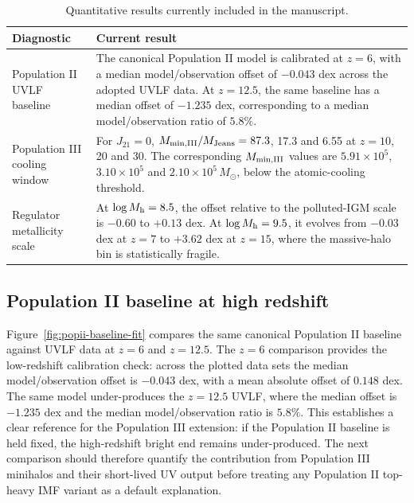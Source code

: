 \documentclass[twocolumn,times]{aastex701}
\begin{document}
\begin{table}[tbp!]
\caption{Quantitative results currently included in the manuscript.}
\label{tab:current-results}
\begin{tabular}{ll}
\toprule
\parbox[t]{0.25\textwidth}{Diagnostic} & \parbox[t]{0.66\textwidth}{Current result} \\
\midrule
\parbox[t]{0.25\textwidth}{Population II UVLF baseline} &
\parbox[t]{0.66\textwidth}{The canonical Population II model is calibrated at $z=6$, with a median model/observation offset of $-0.043$ dex across the adopted UVLF data. At $z=12.5$, the same baseline has a median offset of $-1.235$ dex, corresponding to a median model/observation ratio of $5.8\%$.} \\
\parbox[t]{0.25\textwidth}{Population III cooling window} &
\parbox[t]{0.66\textwidth}{For $J_{21}=0$, $M_{\rm min,III}/M_{\rm Jeans}=87.3$, 17.3 and 6.55 at $z=10$, 20 and 30. The corresponding $M_{\rm min,III}$ values are $5.91\times10^5$, $3.10\times10^5$ and $2.10\times10^5\,M_\odot$, below the atomic-cooling threshold.} \\
\parbox[t]{0.25\textwidth}{Regulator metallicity scale} &
\parbox[t]{0.66\textwidth}{At $\log M_{\rm h}=8.5$, the offset relative to the \citet{Ventura2024} polluted-IGM scale is $-0.60$ to $+0.13$ dex. At $\log M_{\rm h}=9.5$, it evolves from $-0.03$ dex at $z=7$ to $+3.62$ dex at $z=15$, where the massive-halo bin is statistically fragile.} \\
\bottomrule
\end{tabular}
\end{table}

\subsection{Population II baseline at high redshift}\label{subsec:popii-baseline}

Figure~\ref{fig:popii-baseline-fit} compares the same canonical Population II baseline against UVLF data at $z=6$ and $z=12.5$. The $z=6$ comparison provides the low-redshift calibration check: across the plotted data sets the median model/observation offset is $-0.043$ dex, with a mean absolute offset of $0.148$ dex. The same model under-produces the $z=12.5$ UVLF, where the median offset is $-1.235$ dex and the median model/observation ratio is $5.8\%$. This establishes a clear reference for the Population III extension: if the Population II baseline is held fixed, the high-redshift bright end remains under-produced. The next comparison should therefore quantify the contribution from Population III minihalos and their short-lived UV output before treating any Population II top-heavy IMF variant as a default explanation.
\end{document}
